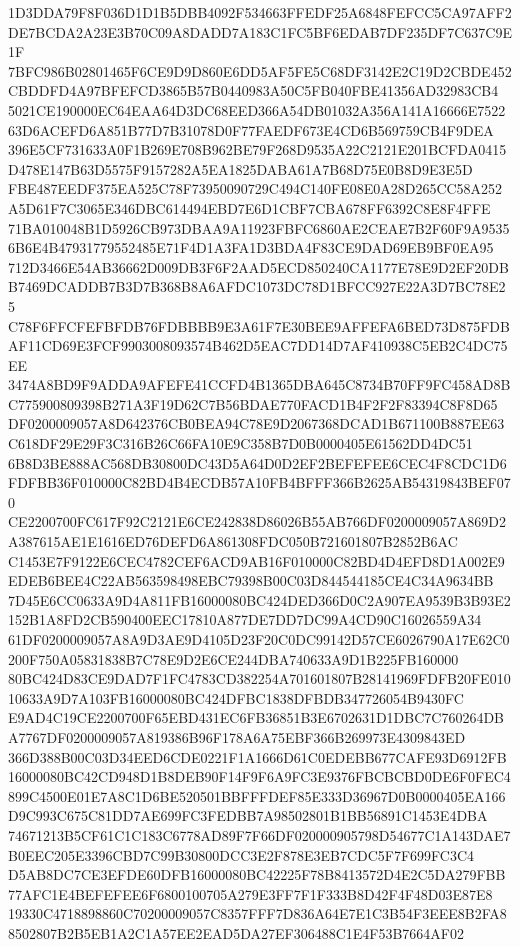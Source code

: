 \documentclass[UTF8,fontset=fandol,zihao=-4,a4paper]{ctexart}
\begin{document}
{{1D3DDA79F8F036D1D1B5DBB4092F534663FFEDF25A6848FEFCC5CA97AFF2DE7BCDA2A23E3B70C09A8DADD7A183C1FC5BF6EDAB7DF235DF7C637C9E1F
7BFC986B02801465F6CE9D9D860E6DD5AF5FE5C68DF3142E2C19D2CBDE452CBDDFD4A97BFEFCD3865B57B0440983A50C5FB040FBE41356AD32983CB4
5021CE190000EC64EAA64D3DC68EED366A54DB01032A356A141A16666E752263D6ACEFD6A851B77D7B31078D0F77FAEDF673E4CD6B569759CB4F9DEA
396E5CF731633A0F1B269E708B962BE79F268D9535A22C2121E201BCFDA0415D478E147B63D5575F9157282A5EA1825DABA61A7B68D75E0B8D9E3E5D
FBE487EEDF375EA525C78F73950090729C494C140FE08E0A28D265CC58A252A5D61F7C3065E346DBC614494EBD7E6D1CBF7CBA678FF6392C8E8F4FFE
71BA010048B1D5926CB973DBAA9A11923FBFC6860AE2CEAE7B2F60F9A95356B6E4B47931779552485E71F4D1A3FA1D3BDA4F83CE9DAD69EB9BF0EA95
712D3466E54AB36662D009DB3F6F2AAD5ECD850240CA1177E78E9D2EF20DBB7469DCADDB7B3D7B368B8A6AFDC1073DC78D1BFCC927E22A3D7BC78E25
C78F6FFCFEFBFDB76FDBBBB9E3A61F7E30BEE9AFFEFA6BED73D875FDBAF11CD69E3FCF9903008093574B462D5EAC7DD14D7AF410938C5EB2C4DC75EE
3474A8BD9F9ADDA9AFEFE41CCFD4B1365DBA645C8734B70FF9FC458AD8BC775900809398B271A3F19D62C7B56BDAE770FACD1B4F2F2F83394C8F8D65
DF0200009057A8D642376CB0BEA94C78E9D2067368DCAD1B671100B887EE63C618DF29E29F3C316B26C66FA10E9C358B7D0B0000405E61562DD4DC51
6B8D3BE888AC568DB30800DC43D5A64D0D2EF2BEFEFEE6CEC4F8CDC1D6FDFBB36F010000C82BD4B4ECDB57A10FB4BFFF366B2625AB54319843BEF070
CE2200700FC617F92C2121E6CE242838D86026B55AB766DF0200009057A869D2A387615AE1E1616ED76DEFD6A861308FDC050B721601807B2852B6AC
C1453E7F9122E6CEC4782CEF6ACD9AB16F010000C82BD4D4EFD8D1A002E9EDEB6BEE4C22AB563598498EBC79398B00C03D844544185CE4C34A9634BB
7D45E6CC0633A9D4A811FB16000080BC424DED366D0C2A907EA9539B3B93E2152B1A8FD2CB590400EEC17810A877DE7DD7DC99A4CD90C16026559A34
61DF0200009057A8A9D3AE9D4105D23F20C0DC99142D57CE6026790A17E62C0200F750A05831838B7C78E9D2E6CE244DBA740633A9D1B225FB160000
80BC424D83CE9DAD7F1FC4783CD382254A701601807B28141969FDFB20FE01010633A9D7A103FB16000080BC424DFBC1838DFBDB347726054B9430FC
E9AD4C19CE2200700F65EBD431EC6FB36851B3E6702631D1DBC7C760264DBA7767DF0200009057A819386B96F178A6A75EBF366B269973E4309843ED
366D388B00C03D34EED6CDE0221F1A1666D61C0EDEBB677CAFE93D6912FB16000080BC42CD948D1B8DEB90F14F9F6A9FC3E9376FBCBCBD0DE6F0FEC4
899C4500E01E7A8C1D6BE520501BBFFFDEF85E333D36967D0B0000405EA166D9C993C675C81DD7AE699FC3FEDBB7A98502801B1BB56891C1453E4DBA
74671213B5CF61C1C183C6778AD89F7F66DF020000905798D54677C1A143DAE7B0EEC205E3396CBD7C99B30800DCC3E2F878E3EB7CDC5F7F699FC3C4
D5AB8DC7CE3EFDE60DFB16000080BC42225F78B8413572D4E2C5DA279FBB77AFC1E4BEFEFEE6F6800100705A279E3FF7F1F333B8D42F4F48D03E87E8
19330C4718898860C70200009057C8357FFF7D836A64E7E1C3B54F3EEE8B2FA88502807B2B5EB1A2C1A57EE2EAD5DA27EF306488C1E4F53B7664AF02
}}
\end{document}
